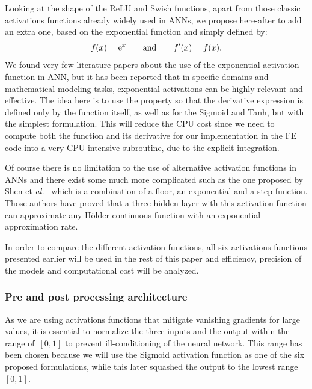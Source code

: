 \documentclass[algorithms,article,submit,pdftex,oneauthors]{Definitions/mdpi}
\makeatletter
\DeclareRobustCommand{\e}[1]{{\rm e}^{#1}}
\DeclareRobustCommand{\eal}{et \emph{al.}\@\xspace}
\makeatother
\begin{document}
Looking at the shape of the ReLU and Swish functions, apart from those classic activations functions already widely used in ANNs, we propose here-after to add an extra one, based on the exponential function and simply defined by:
\begin{equation}
f(x) = \e{x}\qquad \text{and}\qquad f'(x) = f(x).\label{eq:act-exp}
\end{equation}
We found very few literature papers about the use of the exponential activation function in ANN, but it has been reported that in specific domains and mathematical modeling tasks, exponential activations can be highly relevant and effective.
The idea here is to use the property so that the derivative expression is defined only by the function itself, as well as for the Sigmoid and Tanh, but with the simplest formulation.
This will reduce the CPU cost since we need to compute both the function and its derivative for our implementation in the FE code into a very CPU intensive subroutine, due to the explicit integration.

Of course there is no limitation to the use of alternative activation functions in ANNs and there exist some much more complicated such as the one proposed by Shen \eal~\cite{Shen-2021-NNA} which is a combination of a floor, an exponential and a step function.
Those authors have proved that a three hidden layer with this activation function can approximate any Hölder continuous function with an exponential approximation rate.

In order to compare the different activation functions, all six activations functions presented earlier will be used in the rest of this paper and efficiency, precision of the models and computational cost will be analyzed.

\subsubsection{Pre and post processing architecture}\label{subsubsec:ANN-pre}

As we are using activations functions that mitigate vanishing gradients for large values, it is essential to normalize the three inputs and the output within the range of~$[0,1]$ to prevent ill-conditioning of the neural network.
This range has been chosen because we will use the Sigmoid activation function as one of the six proposed formulations, while this later squashed the output to the lowest range~$[0,1]$.
\end{document}
